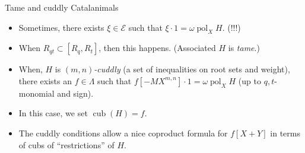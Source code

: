 \documentclass{beamer}
\newcommand{\Ecal}{{\mathcal E}}
\DeclareMathOperator{\pol}{pol}
\newcounter{c}
\begin{document}
\begin{frame}{Tame and cuddly Catalanimals}
  \begin{itemize}
  \item Sometimes, there exists \(\xi \in \Ecal\) such that \(\xi
    \cdot 1 = \omega \pol_X H\). \pause(!!!)\pause
  \item When \(R_{qt} \subset [R_q, R_t]\), then this
    happens. (Associated \(H\)
    is \emph{tame}.)\pause
  \item When, \(H\) is \emph{\((m,n)\)-cuddly} (a set of inequalities
    on root sets and weight), there
    exists an \(f \in \Lambda\) such that \(f[-MX^{m,n}] \cdot 1 =
    \omega \pol_X H\) (up to \(q,t\)-monomial and sign).\pause
  \item In this case, we set \(\operatorname{cub}(H) = f\).\pause
  \item The cuddly conditions allow a nice coproduct formula for
    \(f[X+Y]\) in terms of cubs of ``restrictions'' of \(H\).
  \end{itemize}
\end{frame}
\end{document}
